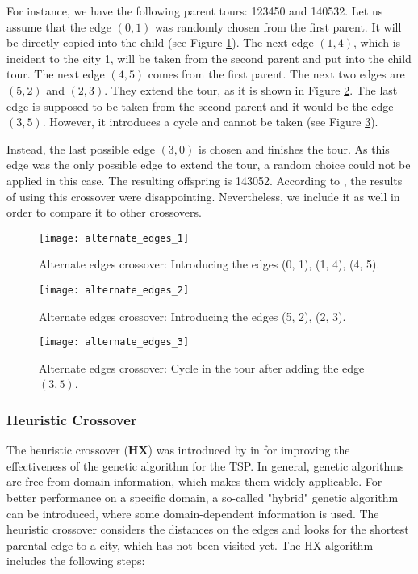 For instance, we have the following parent tours: 123450 and 140532. Let us assume that the edge $(0, 1)$ was randomly chosen from the first parent. It will be directly copied into the child (see Figure \ref{alternate_edges_1}). The next edge $(1, 4)$, which is incident to the city 1, will be taken from the second parent and put into the child tour. The next edge $(4, 5)$ comes from the first parent. The next two edges are $(5, 2)$ and $(2, 3)$. They extend the tour, as it is shown in Figure \ref{alternate_edges_2}. The last edge is supposed to be taken from the second parent and it would be the edge $(3, 5)$. However, it introduces a cycle and cannot be taken (see Figure \ref{alternate_edges_3}).\par

Instead, the last possible edge $(3, 0)$ is chosen and finishes the tour. As this edge was the only possible edge to extend the tour, a random choice could not be applied in this case. The resulting offspring is 143052. According to \citeauthor{grefenstette1985genetic} \cite{grefenstette1985genetic}, the results of using this crossover were disappointing. Nevertheless, we include it as well in order to compare it to other crossovers.

\begin{figure}[htp] \centering
	\centering
	\texttt{[image: alternate\_edges\_1]}
	\caption{Alternate edges crossover: Introducing the edges (0, 1), (1, 4), (4, 5).}
	\label{alternate_edges_1}
\end{figure}

\begin{figure}[htp] \centering
	\centering
	\texttt{[image: alternate\_edges\_2]}
	\caption{Alternate edges crossover: Introducing the edges (5, 2), (2, 3).}
	\label{alternate_edges_2}
\end{figure}

\begin{figure}[htp] \centering
	\centering
	\texttt{[image: alternate\_edges\_3]}
	\caption{Alternate edges crossover: Cycle in the tour after adding the edge $(3, 5)$.}
	\label{alternate_edges_3}
\end{figure}
 
\subsubsection{Heuristic Crossover}
\label{subsubsec:heuristic}

The heuristic crossover (\textbf{HX}) was introduced by \citeauthor{grefenstette1985genetic} in \cite{grefenstette1985genetic} for improving the effectiveness of the genetic algorithm for the TSP. In general, genetic algorithms are free from domain information, which makes them widely applicable.  For better performance on a specific domain, a so-called "hybrid" genetic algorithm can be introduced, where some domain-dependent information is used. The heuristic crossover considers the distances on the edges and looks for the shortest parental edge to a city, which has not been visited yet. The HX algorithm includes the following steps:

